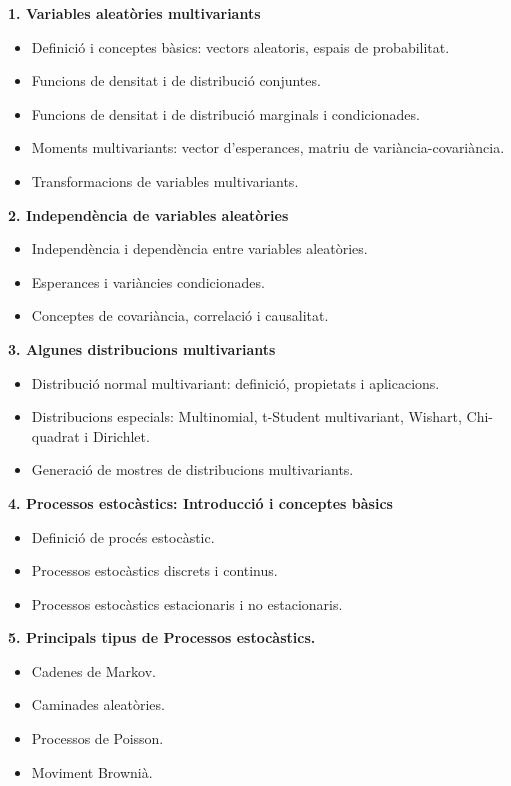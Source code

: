 \documentclass[
  catalan,
]{article}
\theoremstyle{definition}
\theoremstyle{definition}
\theoremstyle{definition}
\theoremstyle{definition}
\theoremstyle{remark}
\begin{document}
\textbf{1. Variables aleatòries multivariants}

\begin{itemize}
\item
  Definició i conceptes bàsics: vectors aleatoris, espais de probabilitat.
\item
  Funcions de densitat i de distribució conjuntes.
\item
  Funcions de densitat i de distribució marginals i condicionades.
\item
  Moments multivariants: vector d'esperances, matriu de variància-covariància.
\item
  Transformacions de variables multivariants.
\end{itemize}

\textbf{2. Independència de variables aleatòries}

\begin{itemize}
\item
  Independència i dependència entre variables aleatòries.
\item
  Esperances i variàncies condicionades.
\item
  Conceptes de covariància, correlació i causalitat.
\end{itemize}

\textbf{3. Algunes distribucions multivariants}

\begin{itemize}
\item
  Distribució normal multivariant: definició, propietats i aplicacions.
\item
  Distribucions especials: Multinomial, t-Student multivariant, Wishart, Chi-quadrat i Dirichlet.
\item
  Generació de mostres de distribucions multivariants.
\end{itemize}

\textbf{4. Processos estocàstics: Introducció i conceptes bàsics}

\begin{itemize}
\item
  Definició de procés estocàstic.
\item
  Processos estocàstics discrets i continus.
\item
  Processos estocàstics estacionaris i no estacionaris.
\end{itemize}

\textbf{5. Principals tipus de Processos estocàstics.}

\begin{itemize}
\item
  Cadenes de Markov.
\item
  Caminades aleatòries.
\item
  Processos de Poisson.
\item
  Moviment Brownià.
\end{itemize}
\end{document}
